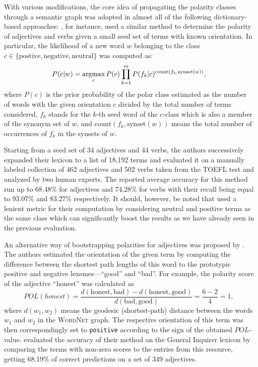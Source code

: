 With various modifications, the core idea of propagating the polarity
classes through a semantic graph was adopted in almost all of the
following dictionary-based approaches: \citet{Kim:04,Kim:06}, for
instance, used a similar method to determine the polarity of
adjectives and verbs given a small seed set of terms with known
orientation.  In particular, the likelihood of a new word $w$
belonging to the class $c \in \{\textrm{postive}, \textrm{negative},
\textrm{neutral}\}$ was computed as:
\begin{equation*}
  P(c|w) = \argmax_{c}P(c)\prod_{k=1}^{m}{P(f_k|c)^{\textrm{count}(f_k,\textrm{synset}(w))}},
\end{equation*}
where $P(c)$ is the prior probability of the polar class estimated as
the number of words with the given orientation $c$ divided by the
total number of terms considered, $f_k$ stands for the $k$-th seed
word of the $c$-class which is also a member of the synonym set of
$w$, and $\textrm{count}(f_k,\textrm{synset}(w))$ means the total
number of occurrences of $f_k$ in the synsets of $w$.

Starting from a seed set of 34 adjectives and 44 verbs, the authors
successively expanded their lexicon to a list of 18,192 terms and
evaluated it on a manually labeled collection of 462 adjectives and
502 verbs taken from the TOEFL test and analyzed by two human experts.
The reported average accuracy for this method run up to 68.48\% for
adjectives and 74.28\% for verbs with their recall being equal to
93.07\% and 83.27\% respectively.  It should, however, be noted that
\citet{Kim:04} used a lenient metric for their computation by
considering neutral and positive terms as the same class which can
significantly boost the results as we have already seen in the
previous evaluation.

An alternative way of bootstrapping polarities for adjectives was
proposed by \citet{Kamps:04}.  The authors estimated the orientation
of the given term by computing the difference between the shortest
path lengths of this word to the prototypic positive and negative
lexemes---``good'' and ``bad''.  For example, the polarity score of
the adjective ``honest'' was calculated as
\begin{equation*}
  POL(honest) = \frac{d(\textrm{honest}, \textrm{bad}) - d(\textrm{honest}, \textrm{good})}%
  {d(\textrm{bad}, \textrm{good})} = \frac{6 - 2}{4} = 1,
\end{equation*}
where $d(w_1, w_2)$ means the geodesic (shortest-path) distance
between the words $w_1$ and $w_2$ in the \textsc{WordNet} graph.  The
respective orientation of this term was then correspondingly set to
\texttt{positive} according to the sign of the obtained
$POL$-value. \citet{Kamps:04} evaluated the accuracy of their method
on the General Inquirer lexicon \cite{Stone:66} by comparing the terms
with non-zero scores to the entries from this resource, getting
68.19\% of correct predictions on a set of 349 adjectives.

